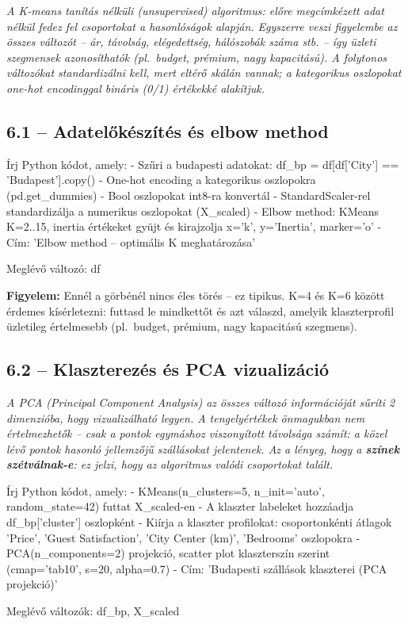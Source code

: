 \documentclass[11pt,a4paper]{article}
\newcommand{\warn}[1]{%
  \vspace{3pt}%
  \begin{tcolorbox}[warnstyle]%
  \textbf{\textcolor{warnborder}{Figyelem:}} #1%
  \end{tcolorbox}\vspace{2pt}}
\begin{document}
\noindent\textit{A K-means tanítás nélküli (unsupervised) algoritmus: előre megcímkézett adat nélkül fedez fel
csoportokat a hasonlóságok alapján. Egyszerre veszi figyelembe az összes változót -- ár, távolság,
elégedettség, hálószobák száma stb. -- így üzleti szegmensek azonosíthatók (pl.\ budget, prémium,
nagy kapacitású). A folytonos változókat standardizálni kell, mert eltérő skálán vannak;
a kategorikus oszlopokat one-hot encodinggal bináris (0/1) értékekké alakítjuk.}

\subsection{6.1 -- Adatelőkészítés és elbow method}

\begin{prompt}
Írj Python kódot, amely:
- Szűri a budapesti adatokat: df_bp = df[df['City'] == 'Budapest'].copy()
- One-hot encoding a kategorikus oszlopokra (pd.get_dummies)
- Bool oszlopokat int8-ra konvertál
- StandardScaler-rel standardizálja a numerikus oszlopokat (X_scaled)
- Elbow method: KMeans K=2..15, inertia értékeket gyüjt és kirajzolja
  x='k', y='Inertia', marker='o'
- Cím: 'Elbow method -- optimális K meghatározása'

Meglévő változó: df
\end{prompt}

\warn{Ennél a görbénél nincs éles törés -- ez tipikus. K=4 és K=6 között érdemes kísérletezni:
futtasd le mindkettőt és azt válaszd, amelyik klaszterprofil üzletileg értelmesebb
(pl.\ budget, prémium, nagy kapacitású szegmens).}

\subsection{6.2 -- Klaszterezés és PCA vizualizáció}

\noindent\textit{A PCA (Principal Component Analysis) az összes változó információját sűríti 2 dimenzióba,
hogy vizualizálható legyen. A tengelyértékek önmagukban nem értelmezhetők -- csak a pontok
egymáshoz viszonyított távolsága számít: a közel lévő pontok hasonló jellemzőjű szállásokat jelentenek.
Az a lényeg, hogy a \textbf{színek szétválnak-e}: ez jelzi, hogy az algoritmus valódi csoportokat talált.}

\begin{prompt}
Írj Python kódot, amely:
- KMeans(n_clusters=5, n_init='auto', random_state=42) futtat X_scaled-en
- A klaszter labeleket hozzáadja df_bp['cluster'] oszlopként
- Kiírja a klaszter profilokat: csoportonkénti átlagok
  'Price', 'Guest Satisfaction', 'City Center (km)', 'Bedrooms' oszlopokra
- PCA(n_components=2) projekció, scatter plot klaszterszín szerint
  (cmap='tab10', s=20, alpha=0.7)
- Cím: 'Budapesti szállások klaszterei (PCA projekció)'

Meglévő változók: df_bp, X_scaled
\end{prompt}
\end{document}
